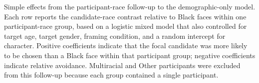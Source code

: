 \documentclass[
  man,
  floatsintext,
  longtable,
  nolmodern,
  notxfonts,
  notimes,
  draftfirst,
  colorlinks=true,linkcolor=blue,citecolor=blue,urlcolor=blue]{apa7}
\begin{document}
\begin{table}

{\caption{{Simple effects from the participant-race follow-up to the
demographic-only model. Each row reports the candidate-race contrast
relative to Black faces within one participant-race group, based on a
logistic mixed model that also controlled for target age, target gender,
framing condition, and a random intercept for character. Positive
coefficients indicate that the focal candidate was more likely to be
chosen than a Black face within that participant group; negative
coefficients indicate relative avoidance. Multiracial and Other
participants were excluded from this follow-up because each group
contained a single participant.}{\label{tbl-demo-participant-race}}}
\vspace{-20pt}}


\end{table}
\end{document}
